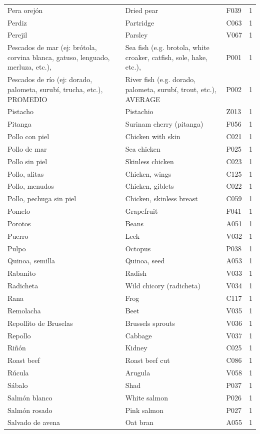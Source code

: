 {\begin{longtable}{p{4.3cm}p{5.5cm}p{1.5cm}p{0.7cm}}
Pera orejón & Dried pear & F039 & 1\\
Perdiz & Partridge & C063 & 1\\
Perejil & Parsley & V067 & 1\\
Pescados de mar (ej: brótola, corvina blanca, gatuso, lenguado, merluza, etc.), & Sea fish (e.g. brotola, white croaker, catfish, sole, hake, etc.), & P001 & 1\\
Pescados de río (ej: dorado, palometa, surubí, trucha, etc.), PROMEDIO & River fish (e.g. dorado, palometa, surubí, trout, etc.), AVERAGE & P002 & 1\\
Pistacho & Pistachio & Z013 & 1\\
Pitanga & Surinam cherry (pitanga) & F056 & 1\\
Pollo con piel & Chicken with skin & C021 & 1\\
Pollo de mar & Sea chicken & P025 & 1\\
Pollo sin piel & Skinless chicken & C023 & 1\\
Pollo, alitas & Chicken, wings & C125 & 1\\
Pollo, menudos & Chicken, giblets & C022 & 1\\
Pollo, pechuga sin piel & Chicken, skinless breast & C059 & 1\\
Pomelo & Grapefruit & F041 & 1\\
Porotos & Beans & A051 & 1\\
Puerro & Leek & V032 & 1\\
Pulpo & Octopus & P038 & 1\\
Quinoa, semilla & Quinoa, seed & A053 & 1\\
Rabanito & Radish & V033 & 1\\
Radicheta & Wild chicory (radicheta) & V034 & 1\\
Rana & Frog & C117 & 1\\
Remolacha & Beet & V035 & 1\\
Repollito de Bruselas & Brussels sprouts & V036 & 1\\
Repollo & Cabbage & V037 & 1\\
Riñón & Kidney & C025 & 1\\
Roast beef & Roast beef cut & C086 & 1\\
Rúcula & Arugula & V058 & 1\\
Sábalo & Shad & P037 & 1\\
Salmón blanco & White salmon & P026 & 1\\
Salmón rosado & Pink salmon & P027 & 1\\
Salvado de avena & Oat bran & A055 & 1\\

\end{longtable}}

